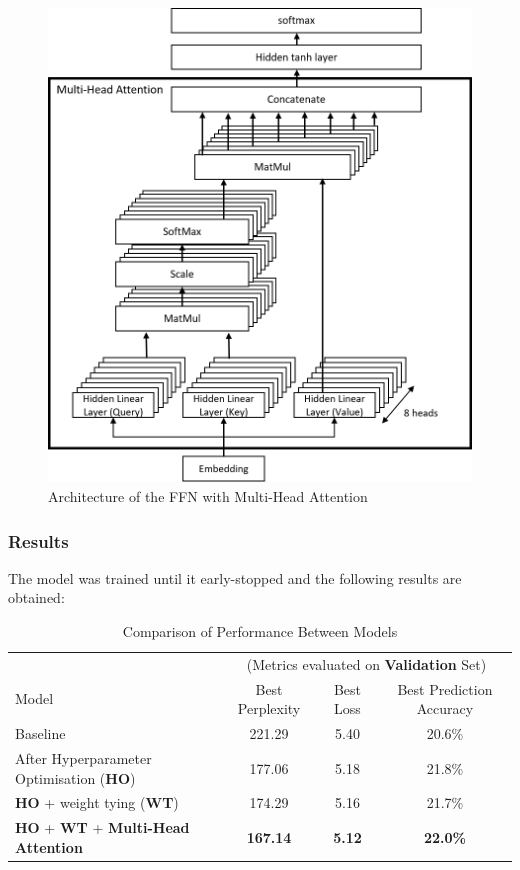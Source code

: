 \documentclass[sigconf,nonacm=true]{acmart}
\begin{document}
\begin{figure}[H]
	\centering
	\includegraphics[scale=0.5]{figures/attentionarchi.png}
	\caption{Architecture of the FFN with Multi-Head Attention}
	\label{fig:attention}
\end{figure}

\subsubsection{Results} The model was trained until it early-stopped and the following results are obtained:

\begin{table}[h]
	\begin{adjustbox}{width=\columnwidth}
		\begin{tabular}{lccc}
			\toprule
			&\multicolumn{3}{c}{(Metrics evaluated on \textbf{Validation} Set)}\\
			Model &Best Perplexity&Best Loss&Best Prediction Accuracy\\
			\midrule
			Baseline & 221.29 & 5.40 & 20.6\% \\
			After Hyperparameter Optimisation (\textbf{HO}) & 177.06 & 5.18 & 21.8\% \\
			\textbf{HO} + weight tying (\textbf{WT})& 174.29 & 5.16 & 21.7\% \\
			\textbf{HO} + \textbf{WT} + \textbf{Multi-Head Attention} & \textbf{167.14} & \textbf{5.12} & \textbf{22.0\%}\\
			\bottomrule
		\end{tabular}
	\end{adjustbox}
	\caption{Comparison of Performance Between Models}
	\label{tab:finalffncomp}
\end{table}
\end{document}
